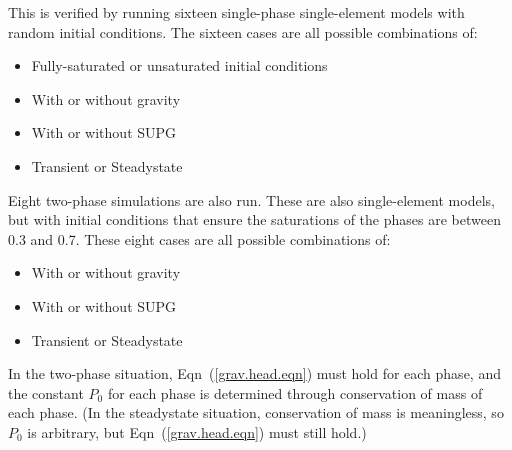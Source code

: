 \documentclass[]{scrreprt}
\begin{document}
This is verified by running sixteen single-phase single-element models
with random initial conditions.  The sixteen cases are all possible
combinations of:
\begin{itemize}
\item Fully-saturated or unsaturated initial conditions
\item With or without gravity
\item With or without SUPG
\item Transient or Steadystate
\end{itemize}
Eight two-phase simulations are also run.  These are also
single-element models, but with initial conditions that ensure the
saturations of the phases are between 0.3 and 0.7.  These eight cases
are all possible combinations of:
\begin{itemize}
\item With or without gravity
\item With or without SUPG
\item Transient or Steadystate
\end{itemize}
In the two-phase situation, Eqn~(\ref{grav.head.eqn}) must hold for
each phase, and the constant $P_{0}$ for each phase is determined
through conservation of mass of each phase.  (In the steadystate
situation, conservation of mass is meaningless, so $P_{0}$ is
arbitrary, but Eqn~(\ref{grav.head.eqn}) must still hold.)
\end{document}
